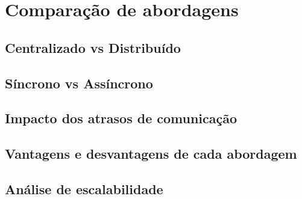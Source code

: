 \section{Comparação de abordagens}

\subsection{Centralizado vs Distribuído}

\subsection{Síncrono vs Assíncrono}

\subsection{Impacto dos atrasos de comunicação} 

\subsection{Vantagens e desvantagens de cada abordagem}

\subsection{Análise de escalabilidade}  